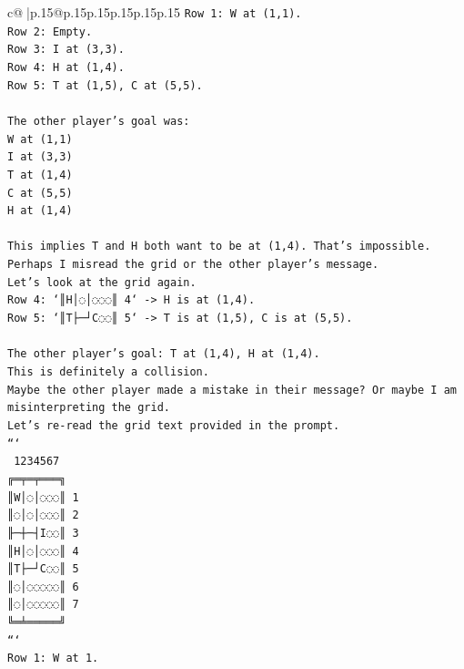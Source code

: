 \documentclass{article}
\begin{document}
{\begin{supertabular}{c@{$\;$}|p{.15\linewidth}@{}p{.15\linewidth}p{.15\linewidth}p{.15\linewidth}p{.15\linewidth}p{.15\linewidth}}
{{{\texttt{Row 1: W at (1,1).} \\
\texttt{Row 2: Empty.} \\
\texttt{Row 3: I at (3,3).} \\
\texttt{Row 4: H at (1,4).} \\
\texttt{Row 5: T at (1,5), C at (5,5).} \\
\\ 
\texttt{The other player's goal was:} \\
\texttt{W at (1,1)} \\
\texttt{I at (3,3)} \\
\texttt{T at (1,4)} \\
\texttt{C at (5,5)} \\
\texttt{H at (1,4)} \\
\\ 
\texttt{This implies T and H both want to be at (1,4). That's impossible.} \\
\texttt{Perhaps I misread the grid or the other player's message.} \\
\texttt{Let's look at the grid again.} \\
\texttt{Row 4: `║H│◌│◌◌◌║ 4` {-}> H is at (1,4).} \\
\texttt{Row 5: `║T├─┘C◌◌║ 5` {-}> T is at (1,5), C is at (5,5).} \\
\\ 
\texttt{The other player's goal: T at (1,4), H at (1,4).} \\
\texttt{This is definitely a collision.} \\
\texttt{Maybe the other player made a mistake in their message? Or maybe I am misinterpreting the grid.} \\
\texttt{Let's re{-}read the grid text provided in the prompt.} \\
\texttt{```} \\
\texttt{ 1234567} \\
\texttt{╔═╤═╤═══╗} \\
\texttt{║W│◌│◌◌◌║ 1} \\
\texttt{║◌│◌│◌◌◌║ 2} \\
\texttt{╟─┼─┤I◌◌║ 3} \\
\texttt{║H│◌│◌◌◌║ 4} \\
\texttt{║T├─┘C◌◌║ 5} \\
\texttt{║◌│◌◌◌◌◌║ 6} \\
\texttt{║◌│◌◌◌◌◌║ 7} \\
\texttt{╚═╧═════╝} \\
\texttt{```} \\
\texttt{Row 1: W at 1.} \\
}}}
\end{supertabular}}
\end{document}
